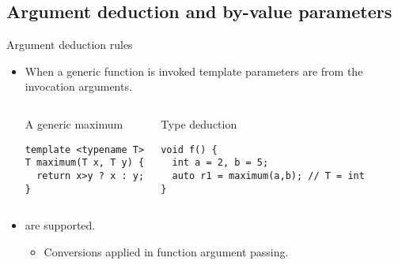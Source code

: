 \subsection{Argument deduction and by-value parameters}

\begin{frame}[t,fragile]{Argument deduction rules}
\begin{itemize}
  \item When a generic function is invoked template parameters are
         from the invocation arguments.

\begin{columns}[T]

\begin{block}{A generic maximum}
\begin{lstlisting}
template <typename T>
T maximum(T x, T y) {
  return x>y ? x : y;
}
\end{lstlisting}
\end{block}

\begin{block}{Type deduction}
\begin{lstlisting}
void f() {
  int a = 2, b = 5;
  auto r1 = maximum(a,b); // T = int
}
\end{lstlisting}
\end{block}
\end{columns}

  \item {} are supported.
    \begin{itemize}
      \item Conversions applied in function argument passing.
    \end{itemize}

\end{itemize}
\end{frame}

